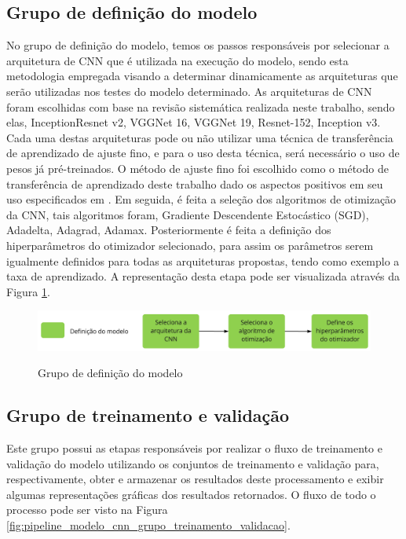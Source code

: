\documentclass[
	12pt,				%
	oneside,			%
	a4paper,			%
	english,			%
	brazil				%
	]{abntex2ppgsi}
\begin{document}
\subsection{Grupo de definição do modelo}
No grupo de definição do modelo, temos os passos responsáveis por selecionar a arquitetura de CNN que é utilizada na execução do modelo, sendo esta metodologia empregada visando a determinar dinamicamente as arquiteturas que serão utilizadas nos testes do modelo determinado. As arquiteturas de CNN foram escolhidas com base na revisão sistemática realizada neste trabalho, sendo elas, InceptionResnet v2, VGGNet 16, VGGNet 19, Resnet-152, Inception v3. Cada uma destas arquiteturas pode ou não utilizar uma técnica de transferência de aprendizado de ajuste fino, e para o uso desta técnica, será necessário o uso de pesos já pré-treinados. O método de ajuste fino foi escolhido como o método de transferência de aprendizado deste trabalho dado os aspectos positivos em seu uso especificados em . Em seguida, é feita a seleção dos algoritmos de otimização da CNN, tais algoritmos foram, Gradiente Descendente Estocástico (SGD), Adadelta, Adagrad, Adamax. Posteriormente é feita a definição dos hiperparâmetros do otimizador selecionado, para assim os parâmetros serem igualmente definidos para todas as arquiteturas propostas, tendo como exemplo a taxa de aprendizado. A representação desta etapa pode ser visualizada através da Figura \ref{fig:pipeline_modelo_cnn_grupo_definicao_modelo}.
 
\begin{figure}[H]
    \centering
    \caption{Grupo de definição do modelo}
    \includegraphics[width=1.0\textwidth]{imagens/materiais_metodos/modulo_modelo/pipeline_modelo_cnn_grupo_definicao_modelo.jpg}
    \label{fig:pipeline_modelo_cnn_grupo_definicao_modelo}
\end{figure}

\subsection{Grupo de treinamento e validação}
Este grupo possui as etapas responsáveis por realizar o fluxo de treinamento e validação do modelo utilizando os conjuntos de treinamento e validação para, respectivamente, obter e armazenar os resultados deste processamento e exibir algumas representações gráficas dos resultados retornados. O fluxo de todo o processo pode ser visto na Figura \ref{fig:pipeline_modelo_cnn_grupo_treinamento_validacao}.
                         
\end{document}
